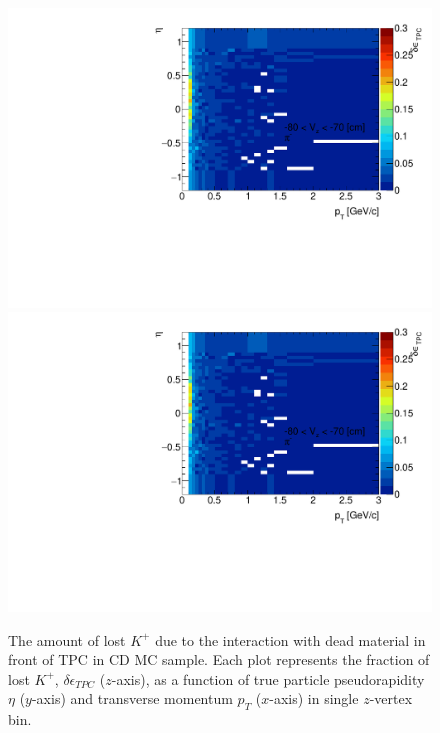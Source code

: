 \begin{figure}[H]
	\caption[The amount of lost $K^+$ due to the interaction with dead material in front of TPC as a function of $p_T$, $\eta$ and $z$-vertex in CD]{The amount of lost $K^+$ due to the interaction with dead material in front of TPC in CD MC sample. Each plot represents the fraction of lost $K^+$, $\delta\epsilon_{ TPC}$ ($z$-axis), as a function of true particle pseudorapidity $\eta$ ($y$-axis) and transverse momentum $p_{T}$ ($x$-axis) in single $z$-vertex bin.}\label{fig:dead_materialCD3DKp}
	\parbox{0.325\textwidth}{
		\includegraphics[width=\linewidth,page=65]{graphics/systematicsEfficiency/deadMaterial/secondaries_Unbinned_CD_.pdf}\\
		\includegraphics[width=\linewidth,page=68]{graphics/systematicsEfficiency/deadMaterial/secondaries_Unbinned_CD_.pdf}\\
}
\end{figure}

